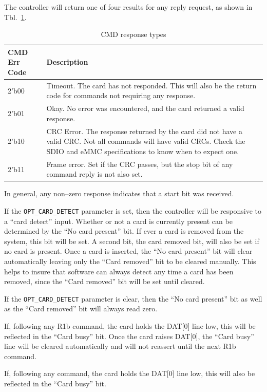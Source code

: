 \documentclass{gqtekspec}
\begin{document}
The controller will return one of four results for any reply request, as
shown in Tbl.~\ref{tbl:CMD-REPLY}.
\begin{table}\begin{center}
\begin{tabular}{|p{1.2in}|p{4.0in}|}\hline
	\rowcolor[gray]{0.85} CMD Err Code & Description\\\hline\hline
2'b00 & Timeout.  The card has not responded.  This will also be the
	return code for commands not requiring any response.\\
2'b01 & Okay.  No error was encountered, and the card returned a valid
	response.\\
2'b10 & CRC Error.  The response returned by the card did not have a valid
	CRC.  Not all commands will have valid CRCs.  Check the SDIO and eMMC
	specifications to know when to expect one.\\
2'b11 & Frame error.  Set if the CRC passes, but the stop bit of any command
	reply is not also set.
	\\\hline
\end{tabular}
\caption{CMD response types}\label{tbl:CMD-REPLY}
\end{center}\end{table}
In general, any non--zero response indicates that a start bit was received.

If the {\tt OPT\_CARD\_DETECT} parameter is set, then the controller will be
responsive to a ``card detect'' input.  Whether or not a card is currently
present can be determined by the ``No card present'' bit.  If ever a card is
removed from the system, this bit will be set.  A second bit, the card removed
bit, will also be set if no card is present.  Once a card is inserted, the
``No card present'' bit will clear automatically leaving only the ``Card
removed'' bit to be cleared manually.  This helps to insure that software
can always detect any time a card has been removed, since the ``Card removed''
bit will be set until cleared.

If the {\tt OPT\_CARD\_DETECT} parameter is clear, then the ``No card present''
bit as well as the ``Card removed'' bit will always read zero.

If, following any R1b command, the card holds the DAT[0] line low, this will be
reflected in the ``Card busy'' bit.  Once the card raises DAT[0], the
``Card busy'' line will be cleared automatically and will not reassert until
the next R1b command.

If, following any command, the card holds the DAT[0] line low, this will also
be reflected in the ``Card busy'' bit.
\end{document}
